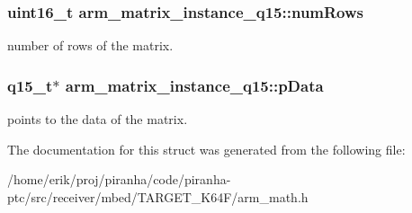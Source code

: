 \subsubsection[{\texorpdfstring{num\+Rows}{numRows}}]{\setlength{\rightskip}{0pt plus 5cm}uint16\+\_\+t arm\+\_\+matrix\+\_\+instance\+\_\+q15\+::num\+Rows}\hypertarget{structarm__matrix__instance__q15_a9bac6ed54be287c4d4f01a1a28be65f5}{}\label{structarm__matrix__instance__q15_a9bac6ed54be287c4d4f01a1a28be65f5}
number of rows of the matrix. 
\subsubsection[{\texorpdfstring{p\+Data}{pData}}]{\setlength{\rightskip}{0pt plus 5cm}q15\+\_\+t$\ast$ arm\+\_\+matrix\+\_\+instance\+\_\+q15\+::p\+Data}\hypertarget{structarm__matrix__instance__q15_a6da33a5553e634787d0f515cf8d724af}{}\label{structarm__matrix__instance__q15_a6da33a5553e634787d0f515cf8d724af}
points to the data of the matrix. 

The documentation for this struct was generated from the following file\+:\begin{DoxyCompactItemize}
\item 
/home/erik/proj/piranha/code/piranha-\/ptc/src/receiver/mbed/\+T\+A\+R\+G\+E\+T\+\_\+\+K64\+F/arm\+\_\+math.\+h\end{DoxyCompactItemize}
